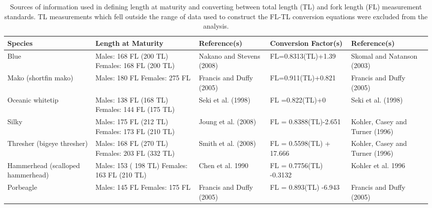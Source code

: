 \documentclass[12pt]{SCreport}
\begin{document}
\begin{landscape}
\begin{table}[ht]
\centering
\caption{Sources of information used in defining length at maturity and converting between total length (TL) and fork length (FL) measurement standards. TL measurements which fell outside the range of data used to construct the FL-TL conversion equations were excluded from the analysis. \label{tab:len_mat}} 
\begin{tabular}{p{2.5cm}p{4cm}lll}
  \hline
Species & Length at Maturity & Reference(s) & Conversion Factor(s) & Reference(s) \\ 
  \hline
Blue & Males: 168 FL (200 TL) 
 Females: 168 FL (200 TL) & Nakano and Stevens (2008) & FL=0.8313(TL)+1.39 & Skomal and Natanson (2003) \\ 
  Mako (shortfin mako) & Males: 180 FL 
 Females: 275 FL & Francis and Duffy (2005) & FL=0.911(TL)+0.821 & Francis and Duffy (2005) \\ 
  Oceanic whitetip & Males: 138 FL (168 TL) 
 Females: 144 FL (175 TL) & Seki et al. (1998) & FL =0.822(TL)+0 & Seki et al. (1998) \\ 
  Silky & Males: 175 FL (212 TL)
 Females: 173 FL (210 TL) & Joung et al. (2008) & FL = 0.8388(TL)-2.651 & Kohler, Casey and Turner (1996) \\ 
  Thresher (bigeye thresher) & Males: 168 FL (270 TL)
 Females: 203 FL (332 TL) & Smith et al. (2008) & FL = 0.5598(TL) + 17.666 & Kohler, Casey and Turner (1996) \\ 
  Hammerhead (scalloped hammerhead) & Males: 153 ( 198 TL)
 Females:  163 FL (210 TL) & Chen et al. 1990 & FL = 0.7756(TL) -0.3132 & Kohler et al. 1996 \\ 
  Porbeagle & Males: 145 FL 
 Females: 175 FL & Francis and Duffy (2005) & FL = 0.893(TL) -6.943 & Francis and Duffy (2005) \\ 
   \hline
\end{tabular}

\end{table}
 \end{landscape}
\end{document}

